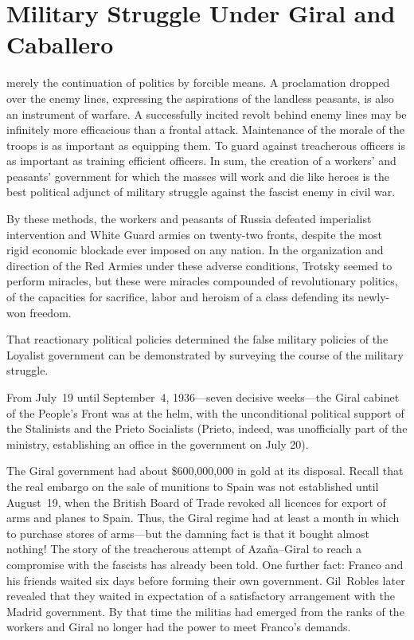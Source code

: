 \chapter{Military Struggle Under Giral and Caballero}

 merely the continuation of politics by forcible means. A proclamation dropped over the enemy lines, expressing the aspirations of the landless peasants, is also an instrument of warfare. A successfully incited revolt behind enemy lines may be infinitely more efficacious than a frontal attack. Maintenance of the morale of the troops is as important as equipping them. To guard against treacherous officers is as important as training efficient officers. In sum, the creation of a workers’ and peasants’ government for which the masses will work and die like heroes is the best political adjunct of military struggle against the fascist enemy in civil war.

By these methods, the workers and peasants of Russia defeated imperialist intervention and White Guard armies on twenty-two fronts, despite the most rigid economic blockade ever imposed on any nation. In the organization and direction of the Red Armies under these adverse conditions, Trotsky seemed to perform miracles, but these were miracles compounded of revolutionary politics, of the capacities for sacrifice, labor and heroism of a class defending its newly-won freedom.

That reactionary political policies determined the false military policies of the Loyalist government can be demonstrated by surveying the course of the military struggle.

\indexIPrieto
From July~19 until September~4, 1936---seven decisive weeks---the Giral cabinet of the People’s Front was at the helm, with the unconditional political support of the Stalinists and the Prieto Socialists (Prieto, indeed, was unofficially part of the ministry, establishing an office in the government on July 20).

\indexJGiral\indexGRobles{}
The Giral government had about \$600,000,000 in gold at its disposal. Recall that the real embargo on the sale of munitions to Spain was not established until August~19, when the British Board of Trade revoked all licences for export of arms and planes to Spain. Thus, the Giral regime had at least a month in which to purchase stores of arms---but the damning fact is that it bought almost nothing! The story of the treacherous attempt of Azaña--Giral to reach a compromise with the fascists has already been told. One further fact: Franco and his friends waited six days before forming their own government. Gil~Robles later revealed that they waited in expectation of a satisfactory arrangement with the Madrid government. By that time the militias had emerged from the ranks of the workers and Giral no longer had the power to meet Franco’s demands.

